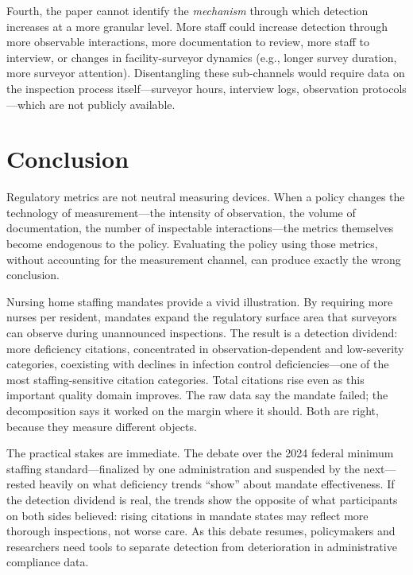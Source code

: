 \documentclass[12pt]{article}
\begin{document}
Fourth, the paper cannot identify the \textit{mechanism} through which detection increases at a more granular level. More staff could increase detection through more observable interactions, more documentation to review, more staff to interview, or changes in facility-surveyor dynamics (e.g., longer survey duration, more surveyor attention). Disentangling these sub-channels would require data on the inspection process itself---surveyor hours, interview logs, observation protocols---which are not publicly available.


\section{Conclusion}
\label{sec:conclusion}

Regulatory metrics are not neutral measuring devices. When a policy changes the technology of measurement---the intensity of observation, the volume of documentation, the number of inspectable interactions---the metrics themselves become endogenous to the policy. Evaluating the policy using those metrics, without accounting for the measurement channel, can produce exactly the wrong conclusion.

Nursing home staffing mandates provide a vivid illustration. By requiring more nurses per resident, mandates expand the regulatory surface area that surveyors can observe during unannounced inspections. The result is a detection dividend: more deficiency citations, concentrated in observation-dependent and low-severity categories, coexisting with declines in infection control deficiencies---one of the most staffing-sensitive citation categories. Total citations rise even as this important quality domain improves. The raw data say the mandate failed; the decomposition says it worked on the margin where it should. Both are right, because they measure different objects.

The practical stakes are immediate. The debate over the 2024 federal minimum staffing standard---finalized by one administration and suspended by the next---rested heavily on what deficiency trends ``show'' about mandate effectiveness. If the detection dividend is real, the trends show the opposite of what participants on both sides believed: rising citations in mandate states may reflect more thorough inspections, not worse care. As this debate resumes, policymakers and researchers need tools to separate detection from deterioration in administrative compliance data.
\end{document}
